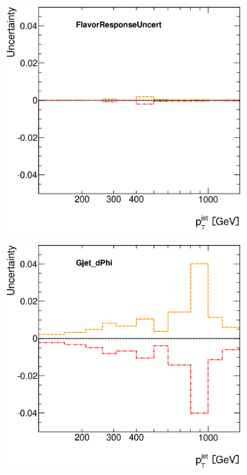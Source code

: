 \documentclass[12pt, twoside]{article}
\numberwithin{equation}{section}
\numberwithin{figure}{section}
\newenvironment{changemargin}[2]{%
\begin{list}{}{%
\setlength{\topsep}{0pt}%
\setlength{\leftmargin}{#1}%
\setlength{\rightmargin}{#2}%
\setlength{\listparindent}{\parindent}%
\setlength{\itemindent}{\parindent}%
\setlength{\parsep}{\parskip}%
}%
\item[]}{\end{list}}
\begin{document}
\begin{figure}[H]
\begin{changemargin}{-1.0cm}{-0.75cm}
\begin{changemargin}{-0.75cm}{-1.0cm}
        \begin{subfigure}[b]{0.25\textwidth}
            \includegraphics[width=\textwidth]{./images/JetSystematics/JetSystematic-5.eps}
        \end{subfigure}
        \begin{subfigure}[b]{0.25\textwidth}
            \includegraphics[width=\textwidth]{./images/JetSystematics/JetSystematic-6.eps}

\end{subfigure}
\end{changemargin}
\end{changemargin}
\end{figure}
\end{document}
